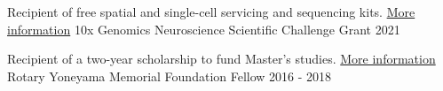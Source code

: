 %
%
%


\vspace*{0.5cm}

\begin{cventries}
    \cventry
        {\textnormal{Recipient of free spatial and single-cell servicing and sequencing kits. \newline \href{https://www.10xgenomics.com/blog/advancing-neuroscience-with-multidimensional-investigations}{More information}}}
        {10x Genomics Neuroscience Scientific Challenge Grant}
        {2021}
        {}
        {}

    \vspace*{-0.1cm}

    \cventry
        {\textnormal{Recipient of a two-year scholarship to fund Master's studies. \newline \href{https://hiroorc.org/event/20180215-2/}{More information}}}
        {Rotary Yoneyama Memorial Foundation Fellow}
        {2016 - 2018}
        {}
        {}

\end{cventries}

\vspace*{-0.65cm}
